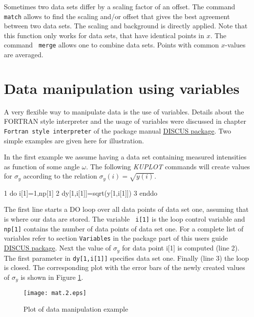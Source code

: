 Sometimes two data sets differ by a scaling factor of an offset. The
command {\tt match} allows to find the scaling and/or offset that
gives the best agreement between two data sets. The scaling and
background is directly applied. Note that this function only works
for data sets, that have identical points in $x$. The command {\tt
merge} allows one to combine data sets. Points with common
$x$-values are averaged.


\section{Data manipulation using variables \label{mat-var}}

A very flexible way to manipulate data is the use of variables.
Details about the FORTRAN style interpreter and the usage of
variables were discussed in chapter {\tt Fortran style interpreter} of
the package manual \href{./package\_man.pdf}{DISCUS package}. Two simple examples
are given here for illustration. \par

In the first example we assume having a data set containing measured
intensities as function of some angle $\omega$. The following {\it
KUPLOT} commands will create values for $\sigma_{y}$ according to the
relation $\sigma_{y}(i) = \sqrt{y(i)}$.

\begin{MacVerbatim}
     1  do i[1]=1,np[1]
     2    dy[1,i[1]]=sqrt(y[1,i[1]])
     3  enddo
\end{MacVerbatim}

The first line starts a DO loop over all data points of data set
one, assuming that is where our data are stored. The variable {\tt
i[1]} is the loop control variable and {\tt np[1]} contains the
number of data points of data set one. For a complete list of
variables refer to section {\tt Variables} in the package part of 
this users guide \href{./package\_man.pdf}{DISCUS package}.
Next the
value of $\sigma_{y}$ for data point i[1] is computed (line 2). The
first parameter in {\tt dy[1,i[1]]} specifies data set one. Finally
(line 3) the loop is closed. The corresponding plot with the error
bars of the newly created values of $\sigma_{y}$ is shown in Figure
\ref{mat-fig2}.

\begin{figure}[!t]
   \centering
   \texttt{[image: mat.2.eps]}
   \caption{Plot of data manipulation example}
   \label{mat-fig2}
\end{figure}

